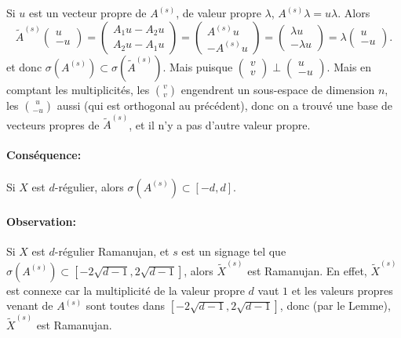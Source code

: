 \begin{preuve}
  Si $u$ est un vecteur propre de $A^{(s)}$, de valeur propre $\lambda$, $A^{(s)} \lambda = u\lambda$. Alors 
  \[ \tilde{A}^{(s)}
    \begin{pmatrix}
      u\\ - u
    \end{pmatrix}
    =
    \begin{pmatrix}
      A_1 u - A_2 u\\ A_2u - A_1 u
    \end{pmatrix}
    =
    \begin{pmatrix}
      A^{(s)} u\\ - A^{(s)}u
    \end{pmatrix}
    =
    \begin{pmatrix}
      \lambda u\\ - \lambda u
    \end{pmatrix}
    = \lambda
    \begin{pmatrix}
      u \\ -u
    \end{pmatrix}.
  \]
  et donc $\sigma(A^{(s)}) \subset \sigma(\tilde{A}^{(s)})$. Mais puisque $
  \begin{pmatrix}
    v\\v
  \end{pmatrix} \perp
  \begin{pmatrix}
    u\\ -u
  \end{pmatrix}$. Mais en comptant les multiplicités, les $\binom{v}{v}$ engendrent un sous-espace de
  dimension $n$, les $\binom{u}{-u}$ aussi (qui est orthogonal au précédent), donc on a trouvé une base de
  vecteurs propres de $\tilde{A}^{(s)}$, et il n'y a pas d'autre valeur propre.
\end{preuve}

\paragraph{Conséquence:} Si $X$ est $d$-régulier, alors $\sigma(A^{(s)}) \subset [-d, d]$.

\paragraph{Observation:} Si $X$ est $d$-régulier Ramanujan, et $s$ est un signage tel que $\sigma(A^{(s)})
\subset \left[-2\sqrt{d-1}, 2\sqrt{d-1}\right]$, alors $\tilde{X}^{(s)}$ est Ramanujan. En effet,
$\tilde{X}^{(s)}$ est connexe car la multiplicité de la valeur propre $d$ vaut $1$ et les valeurs propres
venant de $A^{(s)}$ sont toutes dans $\left[ -2 \sqrt{d-1}, 2 \sqrt{d-1}\right]$, donc (par le Lemme),
$\tilde{X}^{(s)}$ est Ramanujan.


